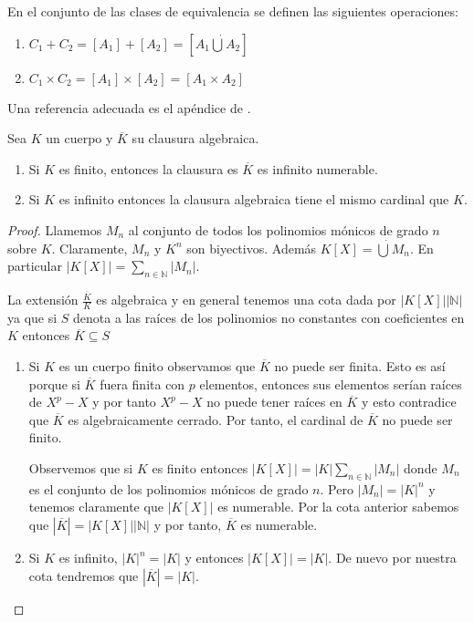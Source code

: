 En el conjunto de las clases de equivalencia se definen las siguientes operaciones:

\begin{enumerate}
\item $C_1+C_2 = [A_1]+[A_2] = [A_1 \dot{\bigcup} A_2]$
\item $C_1 \times C_2 = [A_1] \times [A_2] = [A_1 \times A_2]$
\end{enumerate}

Una referencia adecuada es el apéndice de \cite{algebra-lang}.

\begin{proposition}
Sea $K$ un cuerpo y $\overline{K}$ su clausura algebraica. 

\begin{enumerate}
\item Si $K$ es finito, entonces la clausura es $\overline{K}$ es infinito numerable. 
\item Si $K$ es infinito entonces la clausura algebraica tiene el mismo cardinal que $K$. 
\end{enumerate}
\end{proposition}
\begin{proof}
Llamemos $M_n$ al conjunto de todos los polinomios mónicos de grado $n$ sobre $K$. Claramente, $M_n$ y $K^n$ son biyectivos. Además $K[X] = \dot{\bigcup} M_n$. En particular $|K[X]| = \sum_{n \in \mathbb{N}} |M_n|$. 

La extensión $\frac{\overline{K}}{K}$ es algebraica y en general tenemos una cota dada por $|K[X]||\mathbb{N}|$ ya que si $S$ denota a las raíces de los polinomios no constantes con coeficientes en $K$ entonces $\overline{K} \subseteq S$

\begin{enumerate}
\item Si $K$ es un cuerpo finito observamos que $\overline{K}$ no puede ser finita. Esto es así porque si $\overline{K}$ fuera finita con $p$ elementos, entonces sus elementos serían raíces de $X^p-X$ y por tanto $X^p-X$ no puede tener raíces en $\overline{K}$ y esto contradice que $\overline{K}$ es algebraicamente cerrado. Por tanto, el cardinal de $\overline{K}$ no puede ser finito. 

Observemos que si $K$ es finito entonces $|K[X]| = |K|\sum_{n \in \mathbb{N}} |M_n|$ donde $M_n$ es el conjunto de los polinomios mónicos de grado $n$. Pero $|M_n| = |K|^n$ y tenemos claramente que $|K[X]|$ es numerable. Por la cota anterior sabemos que $|\overline{K}| = |K[X]||\mathbb{N}|$ y por tanto, $\overline{K}$ es numerable. 

\item Si $K$ es infinito, $|K|^n = |K|$ y entonces $|K[X]| = |K|$. De nuevo por nuestra cota tendremos que $|\overline{K}| = |K|$. 
\end{enumerate}
\end{proof}



